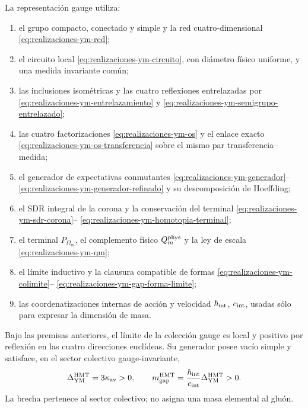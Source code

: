 La representación gauge utiliza:
\begin{enumerate}
 \item el grupo compacto, conectado y simple y la red cuatro-dimensional
       \eqref{eq:realizaciones-ym-red};
 \item el circuito local \eqref{eq:realizaciones-ym-circuito}, con diámetro
       físico uniforme, y una medida invariante común;
 \item las inclusiones isométricas y las cuatro reflexiones entrelazadas por
       \eqref{eq:realizaciones-ym-entrelazamiento} y
       \eqref{eq:realizaciones-ym-semigrupo-entrelazado};
 \item las cuatro factorizaciones
       \eqref{eq:realizaciones-ym-os} y el enlace exacto
       \eqref{eq:realizaciones-ym-os-transferencia} sobre el mismo par
       transferencia--medida;
 \item el generador de expectativas conmutantes
       \eqref{eq:realizaciones-ym-generador}--
       \eqref{eq:realizaciones-ym-generador-refinado} y su descomposición de
       Hoeffding;
 \item el SDR integral de la corona y la conservación del terminal
       \eqref{eq:realizaciones-ym-sdr-corona}--
       \eqref{eq:realizaciones-ym-homotopia-terminal};
 \item el terminal \(P_{\Omega_m}\), el complemento físico
       \(Q_m^{\rm phys}\) y la ley de escala
       \eqref{eq:realizaciones-ym-qm};
 \item el límite inductivo y la clausura compatible de formas
       \eqref{eq:realizaciones-ym-colimite}--
       \eqref{eq:realizaciones-ym-gap-forma-limite};
 \item las coordenatizaciones internas de acción y velocidad
       \(\hbar_{\rm int}\), \(c_{\rm int}\), usadas sólo para expresar la
       dimensión de masa.
\end{enumerate}

\begin{theorem}
\label{thm:realizaciones-ym}
Bajo las premisas anteriores, el límite de la colección gauge es local y
positivo por reflexión en las cuatro direcciones euclídeas. Su generador
posee vacío simple y satisface, en el sector colectivo gauge-invariante,
\begin{equation}\label{eq:realizaciones-ym-gap-limite}
 \Delta_{\rm YM}^{\rm HMT}=3\kappa_{\rm av}>0,
 \qquad
 m_{\rm gap}^{\rm HMT}
 =\frac{\hbar_{\rm int}}{c_{\rm int}}
  \Delta_{\rm YM}^{\rm HMT}>0.
\end{equation}
La brecha pertenece al sector colectivo; no asigna una masa elemental al
gluón.
\end{theorem}


